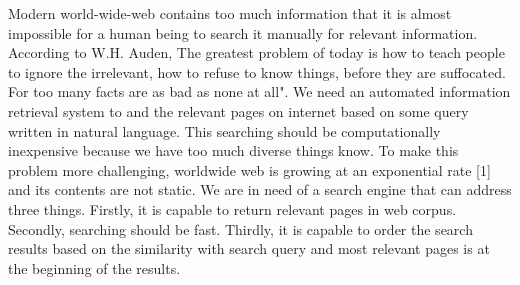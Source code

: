 \label{sec:introduction}

Modern world-wide-web contains too much information that it is almost impossible for a human
being to search it manually for relevant information. According to W.H. Auden, The greatest
problem of today is how to teach people to ignore the irrelevant, how to refuse to know things,
before they are suffocated. For too many facts are as bad as none at all". We need an automated
information retrieval system to and the relevant pages on internet based on some query written in
natural language. This searching should be computationally inexpensive because we have too
much diverse things know. To make this problem more challenging, worldwide web is growing
at an exponential rate [1] and its contents are not static. We are in need of a search engine that
can address three things. Firstly, it is capable to return relevant pages in web corpus. Secondly,
searching should be fast. Thirdly, it is capable to order the search results based on the similarity
with search query and most relevant pages is at the beginning of the results.